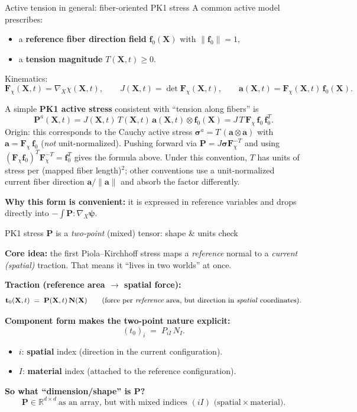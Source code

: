\documentclass[aspectratio=169]{beamer}
\newcommand{\X}{\bm{X}}
\newcommand{\fhat}{\bm{f}_0}       %
\newcommand{\avec}{\bm{a}}         %
\newcommand{\sigmaC}{\bm{\sigma}} %
\newcommand{\Pten}{\bm{P}}        %
\newcommand{\Fdef}{\bm{F}_{\chi}} %
\begin{document}
\begin{frame}{Active tension in general: fiber-oriented PK1 stress}
\small
A common active model prescribes:
\begin{itemize}
\item a \textbf{reference fiber direction field} \(\fhat(\X)\) with \(\|\fhat\|=1\),
\item a \textbf{tension magnitude} \(T(\X,t)\ge 0\).
\end{itemize}

\medskip
Kinematics:
\[
\Fdef(\X,t)=\nabla_{\!X}\chi(\X,t),\qquad
J(\X,t)=\det\Fdef(\X,t),\qquad
\avec(\X,t)=\Fdef(\X,t)\,\fhat(\X).
\]

\medskip
A simple \textbf{PK1 active stress} consistent with ``tension along fibers'' is
\[
\Pten^{a}(\X,t)=J(\X,t)\,T(\X,t)\,\avec(\X,t)\otimes \fhat(\X)
=
J\,T\,\Fdef\,\fhat\,\fhat^{T}.
\]
\scriptsize Origin: this corresponds to the Cauchy active stress \(\sigmaC^{a}=T\,(\avec\otimes\avec)\) with \(\avec=\Fdef\,\fhat\) (\emph{not} unit-normalized). Pushing forward via \(\Pten=J\sigmaC\Fdef^{-T}\) and using \((\Fdef\fhat)^T\Fdef^{-T}=\fhat^T\) gives the formula above. Under this convention, \(T\) has units of stress per (mapped fiber length)\(^2\); other conventions use a unit-normalized current fiber direction \(\avec/\|\avec\|\) and absorb the factor differently.

\medskip
\small
\textbf{Why this form is convenient:} it is expressed in reference variables and drops directly into
\(-\int \Pten:\nabla_X \bm{\psi}\).
\end{frame}

\begin{frame}{PK1 stress \(\mathbf{P}\) is a \emph{two-point} (mixed) tensor: shape \& units check}
\small

\textbf{Core idea:} the first Piola--Kirchhoff stress maps a \emph{reference} normal to a \emph{current (spatial)} traction.
That means it ``lives in two worlds'' at once.

\medskip
\textbf{Traction (reference area \(\rightarrow\) spatial force):}
\[
\mathbf{t}_0(\mathbf{X},t) \;=\; \mathbf{P}(\mathbf{X},t)\,\mathbf{N}(\mathbf{X})
\qquad \text{(force per \emph{reference} area, but direction in \emph{spatial} coordinates)}.
\]

\medskip
\textbf{Component form makes the two-point nature explicit:}
\[
(t_0)_i \;=\; P_{iI}\,N_I.
\]
\begin{itemize}
\item \(i\): \textbf{spatial} index (direction in the current configuration).
\item \(I\): \textbf{material} index (attached to the reference configuration).
\end{itemize}

\medskip
\textbf{So what ``dimension/shape'' is \(\mathbf{P}\)?}
\[
\mathbf{P}\in \mathbb{R}^{d\times d}\ \text{as an array, but with mixed indices }(iI)\text{ (spatial}\times\text{material)}.
\]
\end{frame}
\end{document}
